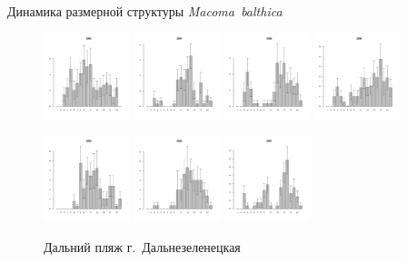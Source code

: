 \documentclass{beamer}
\begin{document}
\begin{frame}{Динамика размерной структуры {\it Macoma~balthica}}

\begin{figure}[h]
\includegraphics[width=25mm]{../Barenc_Sea/Dalnezeleneckaya/DZ_2002_.pdf}
\includegraphics[width=25mm]{../Barenc_Sea/Dalnezeleneckaya/DZ_2004_.pdf}
\includegraphics[width=25mm]{../Barenc_Sea/Dalnezeleneckaya/DZ_2006_.pdf}
\includegraphics[width=25mm]{../Barenc_Sea/Dalnezeleneckaya/DZ_2008_.pdf}
\end{figure}
\begin{figure}[h]
\includegraphics[width=25mm]{../Barenc_Sea/Dalnezeleneckaya/DZ_2003_.pdf}
\includegraphics[width=25mm]{../Barenc_Sea/Dalnezeleneckaya/DZ_2005_.pdf}
\includegraphics[width=25mm]{../Barenc_Sea/Dalnezeleneckaya/DZ_2007_.pdf}
\begin{minipage}{25 mm}
Дальний пляж г.~Дальнезеленецкая
\end{minipage}
\end{figure}
\end{frame}
\end{document}
